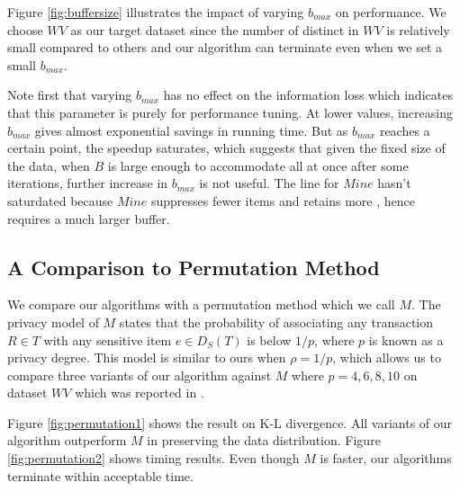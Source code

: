 Figure \ref{fig:buffersize} illustrates
the impact of varying $b_{max}$ on performance.
We choose $WV$ as our target dataset since the number of
distinct \qids in $WV$ is relatively small compared to
others and our algorithm
can terminate even when we set a small $b_{max}$.

Note first that varying $b_{max}$ has no effect on
the information loss which
indicates that this parameter is purely for performance tuning.
At lower values, increasing $b_{max}$ gives almost exponential
savings in running time. But as $b_{max}$ reaches a certain point, the speedup
saturates, which suggests that given the fixed size of the data,
when $B$ is large enough to accommodate all \qids at once after some iterations,
further increase in $b_{max}$ is not useful.
The line for $Mine$ hasn't saturdated because $Mine$ suppresses
fewer items and retains more \qids, hence requires a much larger
buffer.

\subsection{A Comparison to Permutation Method}
We compare our algorithms with a permutation method
\cite{2011:TKDE:Anonymous}
which we call $M$.
The privacy model of $M$
states that the probability of associating any transaction $R \in T$ with
any sensitive item $e \in D_S(T)$ is below $1/p$, where $p$ is known as
a privacy degree. This model is similar to ours when $\rho = 1/p$,
which allows us to compare three variants of our algorithm against
$M$ where $p=4, 6, 8, 10$ on dataset $WV$ which was reported in
\cite{2011:TKDE:Anonymous}.

Figure \ref{fig:permutation1} shows the result on K-L divergence.
All variants of our algorithm outperform $M$ in
preserving the data distribution. Figure \ref{fig:permutation2} shows timing results. Even though $M$ is faster, our algorithms
terminate within acceptable time.

